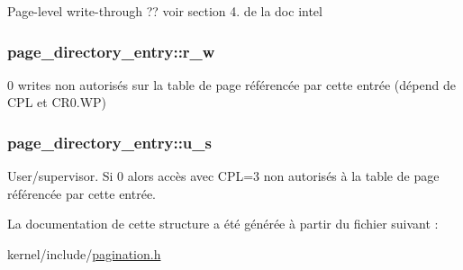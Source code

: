 \-Page-\/level write-\/through ?? voir section 4. de la doc intel \hypertarget{structpage__directory__entry_af4aa8287c5da23728d33053fcb3f1715}{
\subsubsection[{r\-\_\-w}]{ {\bf page\-\_\-directory\-\_\-entry\-::r\-\_\-w}}}\label{structpage__directory__entry_af4aa8287c5da23728d33053fcb3f1715}
0 writes non autorisés sur la table de page référencée par cette entrée (dépend de \-C\-P\-L et \-C\-R0.\-W\-P) \hypertarget{structpage__directory__entry_a6e87e7efc2fbbbd5f8f7fd2e0cd09b3f}{
\subsubsection[{u\-\_\-s}]{ {\bf page\-\_\-directory\-\_\-entry\-::u\-\_\-s}}}\label{structpage__directory__entry_a6e87e7efc2fbbbd5f8f7fd2e0cd09b3f}
\-User/supervisor. \-Si 0 alors accès avec \-C\-P\-L=3 non autorisés à la table de page référencée par cette entrée. 

\-La documentation de cette structure a été générée à partir du fichier suivant \-:\begin{DoxyCompactItemize}
\item 
kernel/include/\hyperlink{pagination_8h}{pagination.\-h}\end{DoxyCompactItemize}
